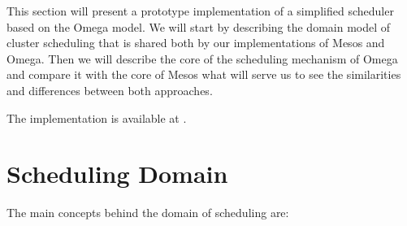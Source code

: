 \documentclass{report}                     %
\begin{document}
This section will present a prototype implementation of a simplified
scheduler based on the Omega model. We will start by describing the
domain model of cluster scheduling that is shared both by our
implementations of Mesos and Omega. Then we will describe the core of
the scheduling mechanism of Omega and compare it with the core of
Mesos what will serve us to see the similarities and differences
between both approaches.

The implementation is available at \cite{_project_scheduler_????}.

\section{Scheduling Domain}

The main concepts behind the domain of scheduling are:
\end{document}
